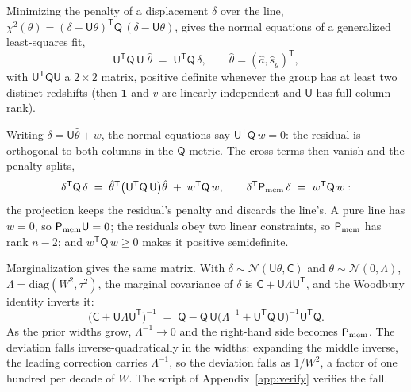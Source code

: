\documentclass[11pt]{article}
\newcommand{\ones}{\mathbf{1}} %
\newcommand{\Cov}{\mathsf{C}}
\newcommand{\Prec}{\mathsf{P}}
\newcommand{\T}{^{\mathsf{T}}}
\begin{document}
Minimizing the penalty of a displacement $\delta$ over the line,
$\chi^2(\theta) = (\delta - \mathsf{U}\theta)\T \mathsf{Q}\,
(\delta - \mathsf{U}\theta)$, gives the normal equations of a
generalized least-squares fit,
\begin{equation}
  \mathsf{U}\T \mathsf{Q}\,\mathsf{U}\;\hat{\theta}
  \;=\;
  \mathsf{U}\T \mathsf{Q}\,\delta ,
  \qquad
  \hat{\theta} = (\hat{a}, \hat{s}_g)\T ,
  \label{eq:memnormal}
\end{equation}
with $\mathsf{U}\T\mathsf{Q}\mathsf{U}$ a $2 \times 2$ matrix,
positive definite whenever the group has at least two distinct
redshifts (then $\ones$ and $v$ are linearly independent and
$\mathsf{U}$ has full column rank).

Writing $\delta = \mathsf{U}\hat{\theta} + w$, the normal equations
say $\mathsf{U}\T \mathsf{Q}\, w = 0$: the residual is orthogonal to
both columns in the $\mathsf{Q}$ metric.  The cross terms then
vanish and the penalty splits,
\begin{equation}
  \delta\T \mathsf{Q}\,\delta
  \;=\;
  \hat{\theta}\T
  \bigl(\mathsf{U}\T \mathsf{Q}\,\mathsf{U}\bigr)\hat{\theta}
  \;+\;
  w\T \mathsf{Q}\, w ,
  \qquad
  \delta\T \Prec_{\rm mem}\,\delta
  \;=\;
  w\T \mathsf{Q}\, w :
  \label{eq:memsplit}
\end{equation}
the projection keeps the residual's penalty and discards the
line's.  A pure line has $w = 0$, so
$\Prec_{\rm mem}\mathsf{U} = 0$; the residuals obey two linear
constraints, so $\Prec_{\rm mem}$ has rank $n - 2$; and
$w\T \mathsf{Q}\, w \geq 0$ makes it positive semidefinite.

Marginalization gives the same matrix.  With
$\delta \sim \mathcal{N}(\mathsf{U}\theta, \Cov)$ and
$\theta \sim \mathcal{N}(0, \Lambda)$,
$\Lambda = \mathrm{diag}(W^2, \tau^2)$, the marginal covariance of
$\delta$ is $\Cov + \mathsf{U}\Lambda\mathsf{U}\T$, and the Woodbury
identity inverts it:
\begin{equation}
  \bigl(\Cov + \mathsf{U}\Lambda\mathsf{U}\T\bigr)^{-1}
  \;=\;
  \mathsf{Q} - \mathsf{Q}\,\mathsf{U}
  \bigl(\Lambda^{-1} + \mathsf{U}\T \mathsf{Q}\,\mathsf{U}\bigr)^{-1}
  \mathsf{U}\T \mathsf{Q} .
  \label{eq:woodbury}
\end{equation}
As the prior widths grow, $\Lambda^{-1} \to 0$ and the right-hand
side becomes $\Prec_{\rm mem}$.  The deviation falls
inverse-quadratically in the widths: expanding the middle inverse,
the leading correction carries
$\Lambda^{-1}$, so the deviation falls as $1/W^2$, a factor of one
hundred per decade of $W$.  The script of Appendix~\ref{app:verify}
verifies the fall.
\end{document}
